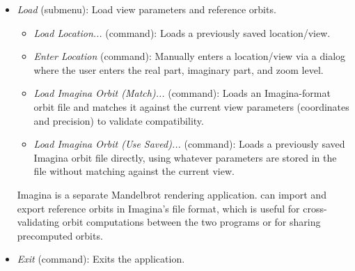 \begin{itemize}
\begin{itemize}
      \item \emph{Save Reference Orbit as Text} (command): Saves the reference orbit in text form.
      \item \emph{Save Compressed Orbit as Text (simple)} (command)
      \item \emph{Save Compressed Orbit as Text (max)} (command)
      \item \emph{Save Compressed Orbit (Imagina/max)} (command): Saves the
      reference orbit in Imagina's file format with maximum compression,
      suitable for import into Imagina or later reload via
      \emph{Load~$\to$~Load Imagina Orbit}.

      \item \emph{Benchmark (5x, full recalc)} (command): Runs 5 full
      recalculation passes using all perturbation result types and reports
      overall and per-pixel rendering times in milliseconds.
      \item \emph{Benchmark (5x, intermediate only)} (command): Runs 5
      recalculation passes using only the medium-resolution perturbation
      results, which isolates intermediate-stage performance.

      \item \emph{Diff Imagina Orbits (choose two)} (command): Opens two
      file-chooser dialogs to select a pair of Imagina-format orbit files, then
      compares them element-by-element and reports any differences.  Useful for
      verifying that two orbit computations produce equivalent results.
    \end{itemize}

  \item \emph{Load} (submenu): Load view parameters and reference orbits.
    \begin{itemize}
      \item \emph{Load Location...} (command): Loads a previously saved location/view.
      \item \emph{Enter Location} (command): Manually enters a location/view
      via a dialog where the user enters the real part, imaginary part, and zoom level.
      \item \emph{Load Imagina Orbit (Match)...} (command): Loads an
      Imagina-format orbit file and matches it against the current view
      parameters (coordinates and precision) to validate compatibility.
      \item \emph{Load Imagina Orbit (Use Saved)...} (command): Loads a
      previously saved Imagina orbit file directly, using whatever parameters
      are stored in the file without matching against the current view.
    \end{itemize}

  Imagina is a separate Mandelbrot rendering application.  \FractalShark{}
  can import and export reference orbits in Imagina's file format, which is
  useful for cross-validating orbit computations between the two programs or
  for sharing precomputed orbits.

  \item \emph{Exit} (command): Exits the application.
\end{itemize}

